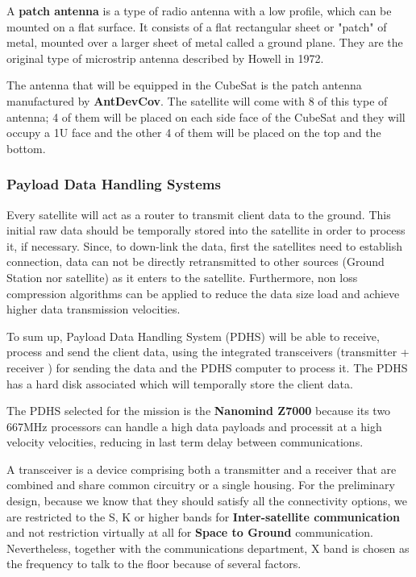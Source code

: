 A \textbf{patch antenna} is a type of radio antenna with a low profile, which can be mounted on a flat surface. It consists of a flat rectangular sheet or "patch" of metal, mounted over a larger sheet of metal called a ground plane. They are the original type of microstrip antenna described by Howell in 1972. \cite{patch}

The antenna that will be equipped in the CubeSat is the patch antenna manufactured by \textbf{AntDevCov}. The satellite will come with 8 of this type of antenna; 4 of them will be placed on each side face of the CubeSat and they will occupy a 1U face and the other 4 of them will be placed on the top and the bottom.

\subsubsection{Payload Data Handling Systems}
Every satellite will act as a router to transmit client data to the ground. This initial raw data should be temporally stored into the satellite in order to process it, if necessary. Since, to down-link the data, first the satellites need to establish connection, data can not be directly retransmitted to other sources (Ground Station nor satellite) as it enters to the satellite. Furthermore, non loss compression algorithms can be applied to reduce the data size load and achieve higher data transmission velocities.

To sum up, Payload Data Handling System (PDHS) will be able to receive, process and send the client data, using the integrated transceivers (transmitter + receiver )  for sending the data and the PDHS computer to process it. The PDHS has a hard disk associated which will temporally store the client data.

The PDHS selected for the mission is the \textbf{Nanomind Z7000} because its two 667MHz processors can handle a high data payloads and processit at a high velocity velocities, reducing in last term delay between communications. \cite[Chapter 1, Section 5]{annex4}

A transceiver is a device comprising both a transmitter and a receiver that are combined and share common circuitry or a single housing. For the preliminary design, because we know that they should satisfy all the connectivity options, we are restricted to the S, K or higher bands for \textbf{Inter-satellite communication} and not restriction virtually at all for \textbf{Space to Ground} communication. Nevertheless, together with the communications department, X band is chosen as the frequency to talk to the floor because of several factors.

